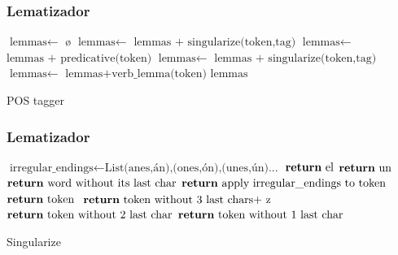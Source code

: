 \documentclass{beamer}
\begin{document}
\begin{frame}
\frametitle{Lematizador}
\begin{algorithm}[H]
\begin{scriptsize}
    \begin{algorithmic}[1]
    \State $\text{lemmas} \gets$ \o
	 	 $\text{lemmas} \gets$ $\text{lemmas + singularize(token,tag)}$ \EndIf 
	 	 $\text{lemmas} \gets$ $\text{lemmas + predicative(token)}$ \EndIf
	 	 $\text{lemmas} \gets$ $\text{lemmas + singularize(token,tag)}$ \EndIf 
	 	 $\text{lemmas} \gets$ $\text{lemmas+verb\_lemma(token)}$ \EndIf 
            \EndFor
            \State \Return $\text{lemmas}$   
        \EndProcedure
    \end{algorithmic}
    \label{alg:rAP}
    \caption{POS tagger}
    \end{scriptsize}
\end{algorithm}
\end{frame}

\begin{frame}
\frametitle{Lematizador}
\begin{algorithm}[H]
\begin{scriptsize}
    \begin{algorithmic}[1]
    \State $\text{irregular\_endings} \gets \text{List(anes,án),(ones,ón),(unes,ún)...}$
	 	 $\text{\Return el}$ \EndIf
	 	 $\text{\Return un}$ \EndIf \EndIf
	 \State $\text{\Return word without its last char}$ \EndIf
	   \State $\text{\Return apply irregular\_endings to token }$ \EndIf
	   \State $\text{\Return token }$ \EndIf
	   \State $\text{\Return token without 3 last chars+ z }$ \EndIf
	   \State $\text{\Return token without 2 last char}$ \EndIf
	   \State $\text{\Return token without 1 last char}$ \EndIf
        \EndProcedure
    \end{algorithmic}
    \label{alg:rAP}
    \caption{Singularize}
    \end{scriptsize}
\end{algorithm}
\end{frame}
\end{document}
